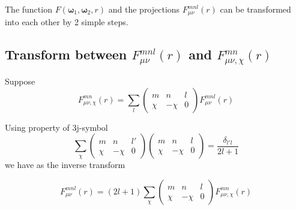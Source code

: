 The function $F(\boldsymbol{\omega}_{1},\boldsymbol{\omega}_{2},r)$
and the projections $F_{\mu\nu}^{mnl}(r)$ can be transformed into
each other by 2 simple steps.

\subsection*{Transform between $F_{\mu\nu}^{mnl}(r)$ and $F_{\mu\nu,\chi}^{mn}(r)$ }

Suppose
\begin{equation}
F_{\mu\nu,\chi}^{mn}(r)=\sum_{l}\left(\begin{array}{ccc}
m & n & l\\
\chi & -\chi & 0
\end{array}\right)F_{\mu\nu}^{mnl}(r)\label{eq:def_f_mn_munuchi}
\end{equation}

Using property of 3j-symbol \citep{Messiah}
\begin{equation}
\sum_{\chi}\left(\begin{array}{ccc}
m & n & l'\\
\chi & -\chi & 0
\end{array}\right)\left(\begin{array}{ccc}
m & n & l\\
\chi & -\chi & 0
\end{array}\right)=\frac{\delta_{l'l}}{2l+1}
\end{equation}
we have as the inverse transform

\begin{equation}
F_{\mu\nu}^{mnl}(r)=\left(2l+1\right)\sum_{\chi}\left(\begin{array}{ccc}
m & n & l\\
\chi & -\chi & 0
\end{array}\right)F_{\mu\nu,\chi}^{mn}(r)
\end{equation}

